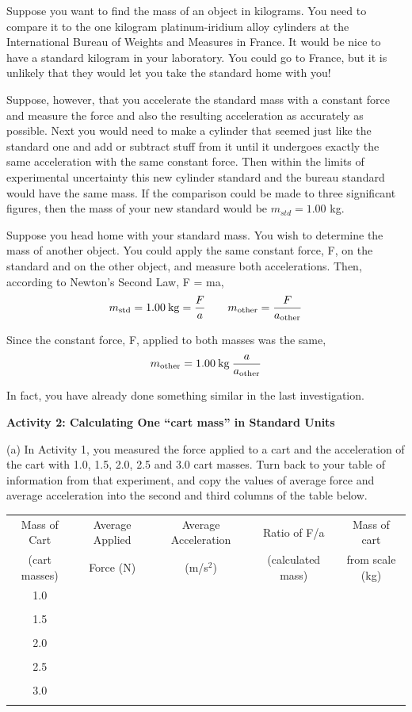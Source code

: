 Suppose you want to find the mass of an object in kilograms. You need to compare
it to the one kilogram platinum-iridium alloy cylinders at the International
Bureau of Weights and Measures in France. It would be nice to have a standard
kilogram in your laboratory. You could go to France, but it is unlikely that
they would let you take the standard home with you!

Suppose, however, that you accelerate the standard mass with a constant force
and measure the force and also the resulting acceleration as accurately as possible.
Next you would need to make a cylinder that seemed just like the standard one
and add or subtract stuff from it until it undergoes exactly the same acceleration
with the same constant force. Then within the limits of experimental uncertainty
this new cylinder standard and the bureau standard would have the same mass.
If the comparison could be made to three significant figures, then the mass
of your new standard would be \( m_{std}  = 1.00\) kg.

Suppose you head home with your standard mass. You wish to determine the mass
of another object. You could apply the same constant force, F, on the standard
and on the other object, and measure both accelerations. Then, according to
Newton's Second Law, F = ma,
\[
m_{\rm std}=1.00\: {\rm kg}=\frac{F}{a}\qquad m_{\rm other}=
\frac{F}{a_{\rm other}}\]


Since the constant force, F, applied to both masses was the same,
\[
m_{\rm other}=1.00\: {\rm kg}\: \frac{a}{a_{\rm other}}\]


In fact, you have already done something similar in the last investigation. 

\textbf{Activity 2: Calculating One ``cart mass'' in Standard
Units }

(a) In Activity 1, you measured the force applied to a cart and the acceleration
of the cart with 1.0, 1.5, 2.0, 2.5 and 3.0 cart masses. Turn back to your table
of information from that experiment, and copy the values of average force and
average acceleration into the second and third columns of the table below.

\vspace{0.3cm}
{\centering \begin{tabular}{|c|c|c|c|c|}
\hline 
Mass of Cart&
Average Applied&
Average Acceleration&
Ratio of F/a&
Mass of cart\\
(cart masses)&
Force (N)&
(m/s\( ^{2} \))&
(calculated mass)&
from scale (kg)\\
\hline 
\hline 
1.0&
&
&
&
\\
&
&
&
&
\\
\hline 
1.5&
&
&
&
\\
&
&
&
&
\\
\hline 
2.0&
&
&
&
\\
&
&
&
&
\\
\hline 
2.5&
&
&
&
\\
&
&
&
&
\\
\hline 
3.0&
&
&
&
\\
&
&
&
&
\\
\hline 
\end{tabular}\par}
\vspace{0.3cm}

